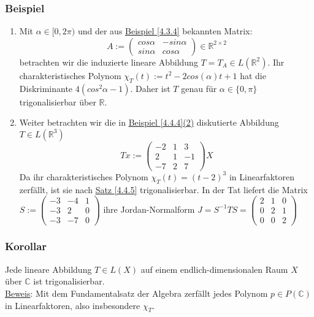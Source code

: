 \subsubsection{Beispiel}
\numbers
\begin{enumerate}
\item Mit $\alpha \in [0,2\pi )$ und der aus \hyperref[4.3.4]{Beispiel \ref{4.3.4}} bekannten Matrix:
\[A:=\begin{pmatrix}cos \alpha & -sin\alpha\\ sin\alpha & cos\alpha\end{pmatrix}\in\mathbb{R}^{2\times 2}\]
betrachten wir die induzierte lineare Abbildung $T=T_A\in L(\mathbb{R}^2)$.  Ihr charakteristisches Polynom $\chi _T(t):=t^2-2cos(\alpha )t+1$ hat die Diskriminante $4(cos^2\alpha -1)$.  Daher ist $T$ genau für $\alpha \in \{0,\pi \}$ trigonalisierbar über $\mathbb{R}$.
\item Weiter betrachten wir die in \hyperref[4.4.4]{Beispiel \ref{4.4.4}(2)} diskutierte Abbildung $T\in L(\mathbb{R}^3)$
\[Tx:=\begin{pmatrix}-2 & 1 & 3\\ 2 & 1 & -1\\ -7 & 2 & 7\end{pmatrix}X\]
Da ihr charakteristisches Polynom $\chi _T(t)=(t-2)^3$ in Linearfaktoren zerfällt, ist sie nach \hyperref[4.4.5]{Satz \ref{4.4.5}} trigonalisierbar.  In der Tat liefert die Matrix $S:=\begin{pmatrix}-3 & -4 & 1\\ -3 & 2 & 0\\ -3 & -7 & 0\end{pmatrix}$ ihre Jordan-Normalform $J=S^{-1}TS=\begin{pmatrix}2 & 1 & 0\\ 0 & 2 & 1\\ 0 & 0 & 2\end{pmatrix}$
\end{enumerate}
\subsubsection{Korollar}
Jede lineare Abbildung $T\in L(X)$ auf einem endlich-dimensionalen Raum $X$ über $\mathbb{C}$ ist trigonalisierbar.\\
\underline{Beweis}: Mit dem Fundamentalsatz der Algebra zerfällt jedes Polynom $p\in P(\mathbb{C})$ in Linearfaktoren, also insbesondere $\chi _T$.

